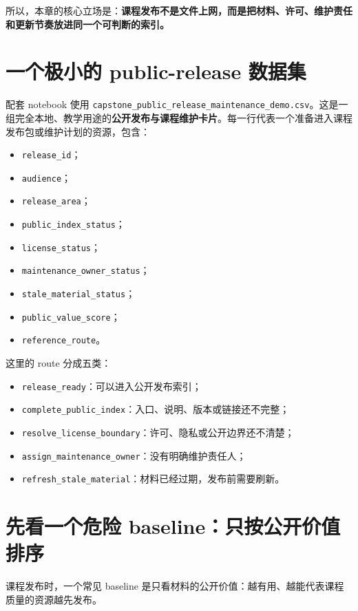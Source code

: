 所以，本章的核心立场是：\textbf{课程发布不是文件上网，而是把材料、许可、维护责任和更新节奏放进同一个可判断的索引。}

\section{一个极小的 public-release 数据集}

配套 notebook 使用 \nolinkurl{capstone_public_release_maintenance_demo.csv}。这是一组完全本地、教学用途的\textbf{公开发布与课程维护卡片}。每一行代表一个准备进入课程发布包或维护计划的资源，包含：

\begin{itemize}
    \item \texttt{release\_id}；
    \item \texttt{audience}；
    \item \texttt{release\_area}；
    \item \texttt{public\_index\_status}；
    \item \texttt{license\_status}；
    \item \texttt{maintenance\_owner\_status}；
    \item \texttt{stale\_material\_status}；
    \item \texttt{public\_value\_score}；
    \item \texttt{reference\_route}。
\end{itemize}

这里的 route 分成五类：

\begin{itemize}
    \item \texttt{release\_ready}：可以进入公开发布索引；
    \item \texttt{complete\_public\_index}：入口、说明、版本或链接还不完整；
    \item \texttt{resolve\_license\_boundary}：许可、隐私或公开边界还不清楚；
    \item \texttt{assign\_maintenance\_owner}：没有明确维护责任人；
    \item \texttt{refresh\_stale\_material}：材料已经过期，发布前需要刷新。
\end{itemize}

\section{先看一个危险 baseline：只按公开价值排序}

课程发布时，一个常见 baseline 是只看材料的公开价值：越有用、越能代表课程质量的资源越先发布。

